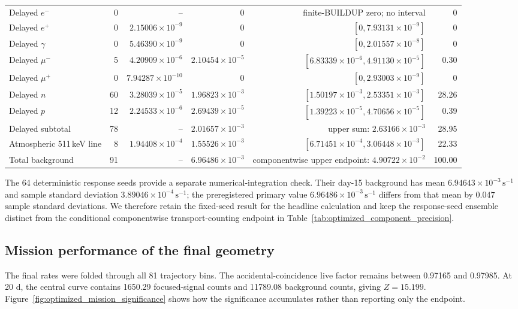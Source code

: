 \documentclass[11pt]{article}
\newcommand{\cps}{\ensuremath{\,\mathrm{s^{-1}}}}
\begin{document}
\begin{table}[!ht]
{\begin{tabular}{lrrrrr}
Delayed $e^-$ & 0 & -- & 0 & finite-BUILDUP zero; no interval & 0 \\
Delayed $e^+$ & 0 & $2.15006\times10^{-9}$ & 0 & $[0,7.93131\times10^{-9}]$ & 0 \\
Delayed $\gamma$ & 0 & $5.46390\times10^{-9}$ & 0 & $[0,2.01557\times10^{-8}]$ & 0 \\
Delayed $\mu^-$ & 5 & $4.20909\times10^{-6}$ & $2.10454\times10^{-5}$ & $[6.83339\times10^{-6},4.91130\times10^{-5}]$ & 0.30 \\
Delayed $\mu^+$ & 0 & $7.94287\times10^{-10}$ & 0 & $[0,2.93003\times10^{-9}]$ & 0 \\
Delayed $n$ & 60 & $3.28039\times10^{-5}$ & $1.96823\times10^{-3}$ & $[1.50197\times10^{-3},2.53351\times10^{-3}]$ & 28.26 \\
Delayed $p$ & 12 & $2.24533\times10^{-6}$ & $2.69439\times10^{-5}$ & $[1.39223\times10^{-5},4.70656\times10^{-5}]$ & 0.39 \\
Delayed subtotal & 78 & -- & $2.01657\times10^{-3}$ & upper sum: $2.63166\times10^{-3}$ & 28.95 \\
Atmospheric 511\,keV line & 8 & $1.94408\times10^{-4}$ & $1.55526\times10^{-3}$ & $[6.71451\times10^{-4},3.06448\times10^{-3}]$ & 22.33 \\
\midrule
Total background & 91 & -- & $6.96486\times10^{-3}$ & componentwise upper endpoint: $4.90722\times10^{-2}$ & 100.00 \\
\bottomrule
\end{tabular}}
\end{table}

The 64 deterministic response seeds provide a separate numerical-integration
check. Their day-15 background has mean
$6.94643\times10^{-3}\cps$ and sample standard deviation
$3.89046\times10^{-4}\cps$; the preregistered primary value
$6.96486\times10^{-3}\cps$ differs from that mean by $0.047$ sample standard
deviations. We therefore retain the fixed-seed result for the headline calculation
and keep the response-seed ensemble distinct from the conditional componentwise
transport-counting endpoint in Table~\ref{tab:optimized_component_precision}.

\FloatBarrier

\subsection{Mission performance of the final geometry}
\label{subsec:final_mission_performance}

The final rates were folded through all 81 trajectory bins. The accidental-coincidence
live factor remains between 0.97165 and 0.97985. At 20 d, the central curve contains
1650.29 focused-signal counts and 11789.08 background counts, giving
$Z=15.199$. Figure~\ref{fig:optimized_mission_significance} shows how the
significance accumulates rather than reporting only the endpoint.
\end{document}

